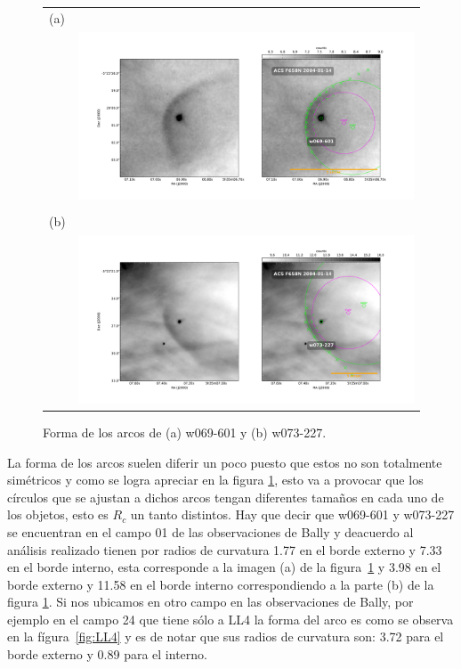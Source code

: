 \documentclass{article}
\begin{document}
\begin{figure}[htp]
\centering
\begin{tabular}{l l}
(a) & \\
 & \includegraphics[width=0.95\linewidth, trim=60 20 60 60, clip]{./j8oc01010_wcs/w069-601-Bally_01-images.pdf}
\\
& \\[2\baselineskip]
(b) & \\
& \includegraphics[width=0.95\linewidth, trim=60 20 60 60, clip]{./j8oc01010_wcs/w073-227-Bally_01-images.pdf}
\\
\end{tabular}
\caption{Forma de los arcos de (a) w069-601 y (b) w073-227.}\label{fig:forma}
\end{figure}

La forma de los arcos suelen diferir un poco puesto que estos  no son totalmente simétricos y como se logra apreciar en la figura \ref{fig:forma}, esto va a provocar que los círculos que se ajustan a dichos arcos tengan diferentes tamaños en cada uno de los objetos, esto es \(R_{c}\) un tanto distintos. Hay que decir que  w069-601 y w073-227 se encuentran en el campo 01 de las observaciones de Bally y deacuerdo al análisis realizado tienen por radios de curvatura 1.77 en el borde externo y 7.33 en el borde interno, esta corresponde a la imagen (a) de la figura~\ref{fig:forma} y 3.98 en el borde externo y 11.58 en el borde interno correspondiendo a la parte (b) de la figura \ref{fig:forma}. Si nos ubicamos en otro campo en las observaciones de Bally, por ejemplo en el campo 24 que tiene sólo a LL4 la forma del arco es como se observa en la fígura~\ref{fig:LL4} y es de notar que sus radios de curvatura son: 3.72 para el borde externo y 0.89 para el interno.\\
\end{document}
